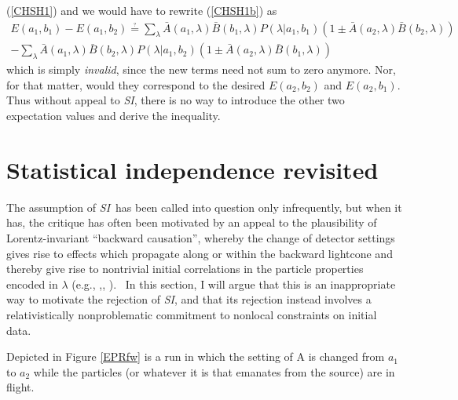 \documentclass[12pt]{article}%
\begin{document}
(\ref{CHSH1}) and we would have to rewrite (\ref{CHSH1b}) as
\begin{multline}
E(a_{1},b_{1})-E(a_{1},b_{2})%
\stackrel{_?}{=} %
{\displaystyle\sum\limits_{\lambda}}
\bar{A}(a_{1},\lambda)\bar{B}(b_{1},\lambda)P(\lambda|a_{1},b_{1})(1\pm\bar
{A}(a_{2},\lambda)\bar{B}(b_{2},\lambda))\\
- 
{\displaystyle\sum\limits_{\lambda}}
\bar{A}(a_{1},\lambda)\bar{B}(b_{2},\lambda)P(\lambda|a_{1},b_{2})(1\pm\bar
{A}(a_{2},\lambda)\bar{B}(b_{1},\lambda))
\label{CHSH2b}%
\end{multline}
which is simply \emph{invalid}, since the new terms need not sum to zero
anymore. Nor, for that matter, would they correspond to the desired
$E(a_{2},b_{2})$ and $E(a_{2},b_{1})$. Thus without appeal to \emph{SI}, there
is no way to introduce the other two expectation values and derive the inequality.

\section{Statistical independence revisited}

The assumption of \emph{SI}\ has been called into question only infrequently,
but when it has, the critique has often been motivated by an appeal to the
plausibility of Lorentz-invariant \textquotedblleft backward
causation\textquotedblright, whereby the change of detector settings gives
rise to effects which propagate along or within the backward lightcone and
thereby give rise to nontrivial initial correlations in the particle
properties encoded in $\lambda$ (e.g., \cite{Cos78},\cite{Suth83},
\cite{Pri96}). \ In this section, I will argue that this is an inappropriate
way to motivate the rejection of \emph{SI}, and that its rejection instead
involves a relativistically nonproblematic commitment to nonlocal constraints
on initial data.

Depicted in Figure \ref{EPRfw} is a run in which the setting of A is changed
from $a_{1}$ to $a_{2}$ while the particles (or whatever it is that emanates
from the source) are in flight.%
\end{document}
